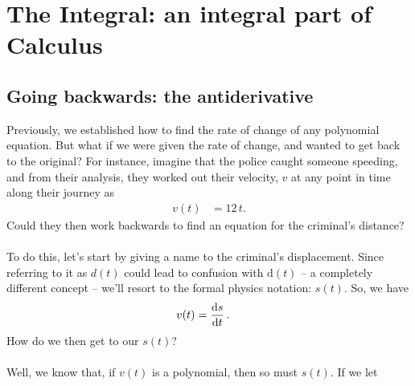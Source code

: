\documentclass[11pt, leqno]{article}
\numberwithin{equation}{section}
\begin{document}
\newpage
\section{The Integral: an integral part of Calculus}
\subsection{Going backwards: the antiderivative}
Previously, we established how to find the rate of change of any polynomial equation. But what if we were given the rate of change, and wanted to get back to the original? For instance, imagine that the police caught someone speeding, and from their analysis, they worked out their velocity, \(v\) at any point in time along their journey as
\begin{align*}
	v(t) &= 12 \, t.
\end{align*} 
Could they then work backwards to find an equation for the criminal's distance? 
\\ \\ To do this, let's start by giving a name to the criminal's displacement. Since referring to it as \(d(t)\) could lead to confusion with \(\text{d}(t)\) -- a completely different concept -- we'll resort to the formal physics notation: \(s(t)\). So, we have
\begin{align*}
v(t) &= \frac{ \mathop{\text{d}s} }{ \mathop{\text{d}t} } \, .
\end{align*}
How do we then get to our \(s(t)\)? 
\\ \\ Well, we know that, if \(v(t)\) is a polynomial, then so must \(s(t)\). If we let 
\end{document}
